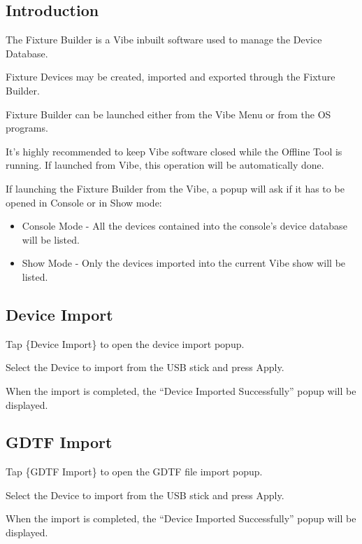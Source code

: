 \documentclass[
]{article}
\begin{document}
\hypertarget{introduction-2}{%
\subsection{Introduction}\label{introduction-2}}

The Fixture Builder is a Vibe inbuilt software used to manage the Device Database.

Fixture Devices may be created, imported and exported through the Fixture Builder.

Fixture Builder can be launched either from the Vibe Menu or from the OS programs.

It's highly recommended to keep Vibe software closed while the Offline Tool is running.
If launched from Vibe, this operation will be automatically done.

If launching the Fixture Builder from the Vibe, a popup will ask if it has to be opened in Console or in Show mode:

\begin{itemize}
\item
  Console Mode - All the devices contained into the console's device database will be listed.
\item
  Show Mode - Only the devices imported into the current Vibe show will be listed.
\end{itemize}

\hypertarget{device-import}{%
\subsection{Device Import}\label{device-import}}

Tap \{Device Import\} to open the device import popup.

Select the Device to import from the USB stick and press Apply.

When the import is completed, the ``Device Imported Successfully'' popup will be displayed.

\hypertarget{gdtf-import}{%
\subsection{GDTF Import}\label{gdtf-import}}

Tap \{GDTF Import\} to open the GDTF file import popup.

Select the Device to import from the USB stick and press Apply.

When the import is completed, the ``Device Imported Successfully'' popup will be displayed.
\end{document}
